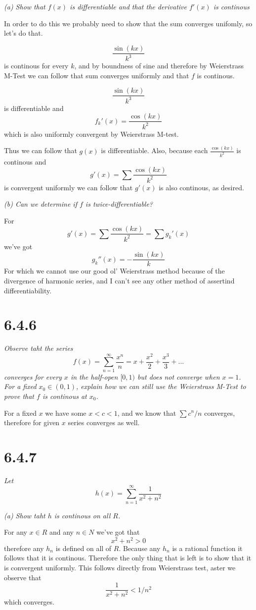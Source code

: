 \documentclass[11pt,oneside,titlepage]{book}
\begin{document}
\textit{(a) Show that $f(x)$ is differentiable and that the derivative
  $f'(x)$ is continous}

In order to do this we probably need to show that the sum converges unifomly,
so let's do that.

$$\frac{\sin(kx)}{k^3}$$
is continous for every $k$, and by boundness of
sine and therefore by Weierstrass M-Test we can follow that sum converges
uniformly and that  $f$ is continous.

$$\frac{\sin(kx)}{k^3}$$
is differentiable and
$$f_k'(x) = \frac{\cos(kx)}{k^2}$$
which is also uniformly convergent by Weierstrass M-test.

Thus we can follow that $g(x)$ is differentiable. Also, because each
$\frac{\cos(kx)}{k^2}$ is continous and
$$g'(x) = \sum \frac{\cos(kx)}{k^2}$$
is convergent uniformly we can follow that $g'(x)$ is also continous, as
desired.

\textit{(b) Can we determine if $f$ is twice-differentiable?}

For
$$g'(x) = \sum \frac{\cos(kx)}{k^2} = \sum g_k'(x)$$
we've got
$$g_k''(x) = - \frac{\sin(kx)}{k}$$
For which we cannot use our good ol' Weierstrass method because of the
divergence of harmonic series, and I can't see any other method of assertind
differentiability.

\section*{6.4.6}
\textit{Observe taht the series }
$$f(x) = \sum_{n = 1}^{\infty}{\frac{x^n}{n}} = x + \frac{x^2}{2} +
\frac{x^3}{3} + ... $$
\textit{converges for every $x$ in the half-open $[0, 1)$ but does not
  converge when $x = 1$. For a fixed $x_0 \in (0, 1)$, explain how we can still
  use the Weierstrass M-Test to prove that $f$ is continous at $x_0$.}

For a fixed $x$ we have some $x < c < 1$, and we know that
$\sum c^n/n$ converges, therefore for given $x$ series converges as well.

\section*{6.4.7}
\textit{Let }
$$h(x) = \sum_{n = 1}^{\infty}{\frac{1}{x^2 + n^2}}$$

\textit{(a) Show taht $h$ is continous on all $R$.}

For any $x \in R$ and any $n \in N$ we've got that
$$x^2 + n^2 > 0$$
therefore any $h_n$ is defined on all of $R$. Because any $h_n$ is a rational
function it follows that it is continous. Therefore the only thing that is left
is to show that it is convergent uniformly. This follows directly from
Weierstrass test, aster we observe that
$$\frac{1}{x^2 + n^2} < 1/n^2$$
which converges.
\end{document}
